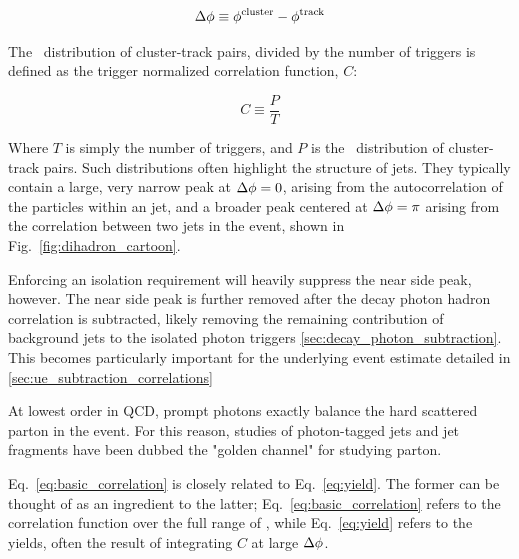 \begin{equation}
	\Delta\phi \equiv \phi^\mathrm{cluster} - \phi^\mathrm{track}
\end{equation}

 The \deltaphi~distribution of cluster-track pairs, divided by the number of triggers is defined as the trigger normalized correlation function, $C$:

\begin{equation}
\label{eq:basic_correlation}
	C \equiv \frac{P}{T}
\end{equation}

Where $T$ is simply the number of triggers, and $P$ is the \deltaphi~distribution of cluster-track pairs. Such distributions often highlight the structure of jets. They typically contain a large, very narrow peak at $\Delta\phi=0$, arising from the autocorrelation of the particles within an jet, and a broader peak centered at $\Delta\phi=\pi$ arising from the correlation between two jets in the event, shown in Fig.~\ref{fig:dihadron_cartoon}. 

Enforcing an isolation requirement will heavily suppress the near side peak, however. The near side peak is further removed after the decay photon hadron correlation is subtracted, likely removing the remaining contribution of background jets to the isolated photon triggers \ref{sec:decay_photon_subtraction}. This becomes particularly important for the underlying event estimate detailed in \ref{sec:ue_subtraction_correlations}


At lowest order in QCD, prompt photons exactly balance the hard scattered parton in the event. For this reason, studies of photon-tagged jets and jet fragments have been dubbed the "golden channel" for studying parton. %


Eq.~\ref{eq:basic_correlation} is closely related to Eq.~\ref{eq:yield}. The former can be thought of as an ingredient to the latter; Eq.~\ref{eq:basic_correlation} refers to the correlation function over the full range of \deltaphi, while Eq.~\ref{eq:yield} refers to the yields, often the result of integrating $C$ at large  $\Delta\phi$.

